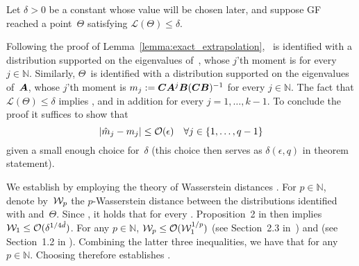 \begin{sproof}
Let $\delta > 0$ be a constant whose value will be chosen later, and suppose GF reached a point~$\Theta$ satisfying $\mathcal{L} ( \Theta ) \leq \delta$.

Following the proof of Lemma~\ref{lemma:exact_extrapolation}, \smash{$\hat{\Theta}$}~is identified with a distribution supported on the eigenvalues of~\smash{$\hat{\mA}$}, whose $j$'th moment is  for every $j \in \mathbb{N}$.
Similarly, $\Theta$~is identified with a distribution supported on the eigenvalues of~${\bm{A}}$, whose $j$'th moment is $m_j := {\bm{C}} {\bm{A}}^j {\bm{B}} ( {\bm{C}} {\bm{B}} )^{-1}$ for every $j \in \mathbb{N}$.
The fact that $\mathcal{L} ( \Theta ) \leq \delta$ implies \smash{$| \mC \mB - \hat{\mC} \hat{\mB} | \leq \sqrt{\delta}$}, and in addition  for every $j = 1 , \ldots , k - 1$. 
To conclude the proof it suffices to show that
\begin{equation}
\label{eq:moments_approx}
| \hat{m}_j - m_j | \leq \mathcal{O} ( \epsilon ) \quad \forall j \in \{ 1 , \ldots , q - 1 \}
\end{equation}
given a small enough choice for~$\delta$ (this choice then serves as $\delta ( \epsilon , q )$ in theorem statement).

We establish  by employing the theory of Wasserstein distances \citep{vaserstein1969markov}.
For $p \in \mathbb{N}$, denote by~$\mathcal{W}_p$ the $p$-Wasserstein distance between the distributions identified with \smash{$\hat{\Theta}$} and~$\Theta$.
Since , it holds that  for every .
Proposition~2 in \cite{wu2020optimal} then implies $\mathcal{W}_1 \leq \mathcal{O} ( \delta^{1 / 4 \hat{d}} )$.
For any $p \in \mathbb{N}$, $\mathcal{W}_p \leq \mathcal{O} ( \mathcal{W}_1^{1 / p})$ (see Section~2.3 in~\cite{panaretos2019statistical}) and  (see Section~1.2 in \cite{biswas2021bounding}).
Combining the latter three inequalities, we have that  for any $p \in \mathbb{N}$.
Choosing  therefore establishes .
\end{sproof}
